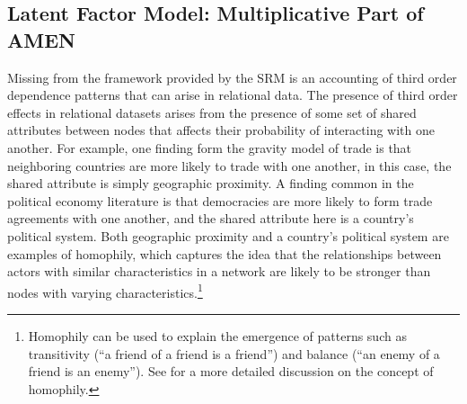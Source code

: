 

\subsection{Latent Factor Model: Multiplicative Part of AMEN}

Missing from the framework provided by the SRM is an accounting of third order dependence patterns that can arise in relational data. The presence of third order effects in relational datasets arises from the presence of some set of shared attributes between nodes that affects their probability of interacting with one another. For example, one finding form the gravity model of trade is that neighboring countries are more likely to trade with one another, in this case, the shared attribute is simply geographic proximity. A finding common in the political economy literature is that democracies are more likely to form trade agreements with one another, and the shared attribute here is a country's political system. Both geographic proximity and a country's political system are examples of homophily, which captures the idea that the relationships between actors with similar characteristics in a network are likely to be stronger than nodes with varying characteristics.\footnote{Homophily can be used to explain the emergence of patterns such as transitivity (``a friend of a friend is a friend'') and balance (``an enemy of a friend is an enemy''). See \citet{shalizi:thomas:2011} for a more detailed discussion on the concept of homophily.} 

